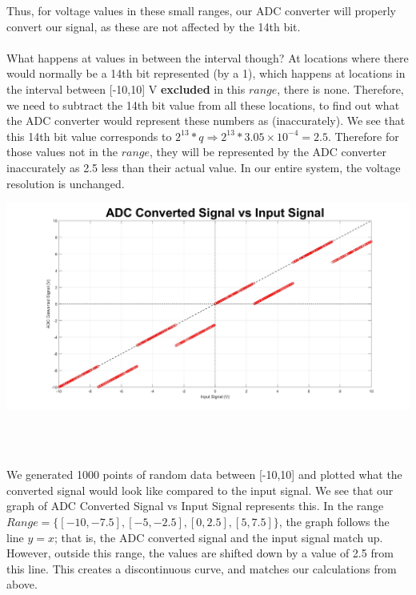 \documentclass[12pt, a4paper]{article}
\begin{document}
\begin{enumerate}
\begin{enumerate}
Thus, for voltage values in these small ranges, our ADC converter will properly convert our signal, as these are not affected by the 14th bit. \\ \\ What happens at values in between the interval though? At locations where there would normally be a 14th bit represented (by a 1), which happens at locations in the interval between [-10,10] V \textbf{excluded} in this $range$, there is none. Therefore, we need to subtract the 14th bit value from all these locations, to find out what the ADC converter would represent these numbers as (inaccurately). We see that this 14th bit value corresponds to $2^{13} * q \Rightarrow 2^{13} * 3.05 \times 10^{-4} = 2.5$. Therefore for those values not in the $range$, they will be represented by the ADC converter inaccurately as 2.5 less than their actual value. In our entire system, the voltage resolution is unchanged.

\begin{minipage}[t]{\linewidth}
\centering
\includegraphics[width=1\textwidth]{hw22}
\end{minipage} \\ \\
\end{enumerate}

We generated 1000 points of random data between [-10,10] and plotted what the converted signal would look like compared to the input signal. We see that our graph of ADC Converted Signal vs Input Signal represents this. In the range $Range = \{ [-10, -7.5], [-5 , -2.5], [0, 2.5], [5, 7.5]\}$, the graph follows the line $y= x$; that is, the ADC converted signal and the input signal match up. However, outside this range, the values are shifted down by a value of 2.5 from this line. This creates a discontinuous curve, and matches our calculations from above.


\end{enumerate}
\end{document}
